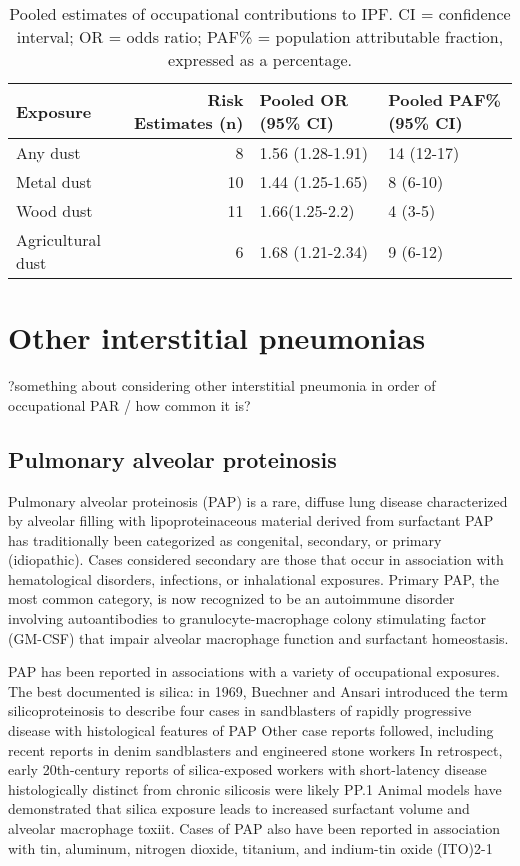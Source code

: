 \documentclass[a4
er,12pt]{article}
\begin{document}
\begin{table}
    \begin{tabular}{lrll}
        \textbf{Exposure} &  \textbf{Risk Estimates (n)} & \textbf{Pooled OR (95\% CI)} & \textbf{Pooled PAF\% (95\% CI)} \\
              \midrule
               Any dust &  8 &  1.56 (1.28-1.91) &  14 (12-17) \\
               Metal dust &  10 &  1.44 (1.25-1.65) &  8 (6-10) \\
               Wood dust &  11 &  1.66(1.25-2.2) &  4 (3-5) \\
               Agricultural dust &  6 &  1.68 (1.21-2.34) &  9 (6-12) \\
               \bottomrule
    \end{tabular}
    \caption{Pooled estimates of occupational contributions to IPF. CI = confidence interval; OR = odds ratio; PAF\% = population attributable fraction, expressed as a percentage.}
    \label{table:ipfpooled}
\end{table}


\section{Other interstitial pneumonias}

?something about considering other interstitial pneumonia in order of occupational PAR / how common it is?

\subsection{Pulmonary alveolar proteinosis}
Pulmonary alveolar proteinosis (PAP) is a rare, diffuse lung disease characterized by alveolar filling with lipoproteinaceous material derived from surfactant  PAP has traditionally been categorized as congenital, secondary, or primary (idiopathic).  Cases considered secondary are those that occur in association with hematological disorders, infections, or inhalational exposures.  Primary PAP, the most common category, is now recognized to be an autoimmune disorder involving autoantibodies
to granulocyte-macrophage colony stimulating factor (GM-CSF) that impair alveolar macrophage function and surfactant homeostasis.

PAP has been reported in associations with a variety of occupational exposures.  The best documented is silica: in 1969, Buechner and Ansari introduced the term silicoproteinosis to describe four cases in sandblasters of rapidly progressive disease with histological features of PAP  Other case reports followed, including recent reports in denim sandblasters and engineered stone workers  In retrospect, early 20th-century reports of silica-exposed workers with short-latency disease
histologically distinct from chronic silicosis were likely PP.1  Animal models have demonstrated that silica exposure leads to increased surfactant volume and alveolar macrophage toxiit.  Cases of PAP also have been reported in association with tin, aluminum, nitrogen dioxide, titanium, and indium-tin oxide (ITO)2-1
\end{document}
